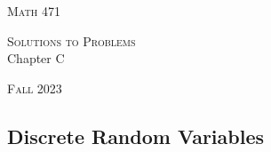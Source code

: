 


\hrulefill

\begin{minipage}{0.33\textwidth}
\textsc{Math 471}
\end{minipage} \hfill 
\begin{minipage}{0.32\textwidth}
\centering
\textsc{Solutions to Problems} \\
Chapter C
\end{minipage}
 \hfill 
 \begin{minipage}{0.33\textwidth}
 \flushright \textsc{Fall 2023}
 \end{minipage}

\hrulefill

\setcounter{section}{3}

\subsection{Discrete Random Variables}
    
